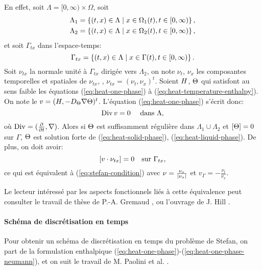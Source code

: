 En effet, soit $\Lambda = [0, \infty)\times \Omega$, soit
\begin{align}
  & \Lambda_1 = \left\{ (t, x)\in\Lambda\mid x \in \Omega_1(t), t \in
  [0,\infty) \right\},\\
  & \Lambda_2 = \left\{ (t, x)\in\Lambda\mid x \in \Omega_2(t), t \in
  [0,\infty) \right\},\\
\end{align}
et soit $\Gamma_{tx}$ dans l'espace-temps:
\begin{equation}
  \Gamma_{tx} = \left\{ (t, x) \in \Lambda\mid x \in \Gamma(t), t \in
  [0,\infty) \right\}.
\end{equation}
Soit $\nu_{tx}$ la normale unité à $\Gamma_{tx}$ dirigée vers
$\Lambda_2$, on note $\nu_t$, $\nu_x$ les composantes temporelles et
spatiales de $\nu_{tx}$, \ie, $\nu_{tx} = (\nu_t, \nu_x)^t$. Soient
$H$, $\Theta$ qui satisfont au sens faible les équations
(\ref{eq:heat-one-phase}) à (\ref{eq:heat-temperature-enthalpy}). On
note le $v = (H, -D_\Theta\nabla
\Theta)^t$. L'équation (\ref{eq:heat-one-phase}) s'écrit donc:
\begin{equation}\label{eq:space-time-divergence}
  \operatorname{Div} v = 0 \quad\text{ dans }\Lambda,
\end{equation}
où $\operatorname{Div} = (\frac{\partial}{\partial t}, \nabla)$. Alors si
$\Theta$ est suffisamment régulière dans
$\Lambda_1\cup\Lambda_2$ et $\left[ \Theta \right] = 0$ sur $\Gamma$, $\Theta$ est solution forte de
(\ref{eq:heat-solid-phase}), (\ref{eq:heat-liquid-phase}). De plus,
on doit avoir:
\begin{equation}
  \left[ v\cdot \nu_{tx} \right] = 0 \quad \text{sur } \Gamma_{tx},
\end{equation}
ce qui est équivalent à (\ref{eq:stefan-condition}) avec $\nu =
\frac{\nu_x}{\left\lvert \nu_x \right\rvert}$ et $v_\Gamma = -\frac{\nu_t}{\nu_x}$.

Le lecteur intéressé par les aspects fonctionnels liés à cette
équivalence peut consulter le travail de thèse de
P.-A. Gremaud \cite{Gremaud1991}, ou l'ouvrage de J. Hill
\cite{HillStefanProblems}.

\paragraph{Schéma de discrétisation en temps}
Pour obtenir un schéma de discrétisation en temps du problème de
Stefan, on part de la formulation enthalpique
(\ref{eq:heat-one-phase})-(\ref{eq:heat-one-phase-neumann}), et on
suit le travail de M. Paolini et al. \cite{Paolini1988}.

